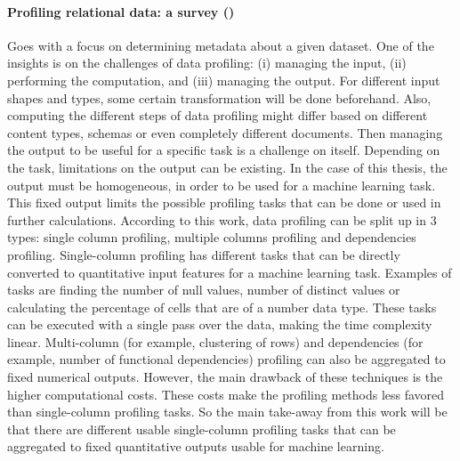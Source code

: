 \paragraph{Profiling relational data: a survey (\cite{Abedjan2015-ul})} 
Goes with a focus on determining metadata about a given dataset. One of the insights is on the challenges of data profiling: (i) managing the input, (ii) performing the computation, and (iii) managing the output. For different input shapes and types, some certain transformation will be done beforehand. Also, computing the different steps of data profiling might differ based on different content types, schemas or even completely different documents. Then managing the output to be useful for a specific task is a challenge on itself. Depending on the task, limitations on the output can be existing. In the case of this thesis, the output must be homogeneous, in order to be used for a machine learning task. 
This fixed output limits the possible profiling tasks that can be done or used in further calculations. According to this work, data profiling can be split up in 3 types: single column profiling, multiple columns profiling and dependencies profiling. 
Single-column profiling has different tasks that can be directly converted to quantitative input features for a machine learning task. Examples of tasks are finding the number of null values, number of distinct values or calculating the percentage of cells that are of a number data type. These tasks can be executed with a single pass over the data, making the time complexity linear. 
Multi-column (for example, clustering of rows) and dependencies (for example, number of functional dependencies) profiling can also be aggregated to fixed numerical outputs. However, the main drawback of these techniques is the higher computational costs. These costs make the profiling methods less favored than single-column profiling tasks.
So the main take-away from this work will be that there are different usable single-column profiling tasks that can be aggregated to fixed quantitative outputs usable for machine learning.